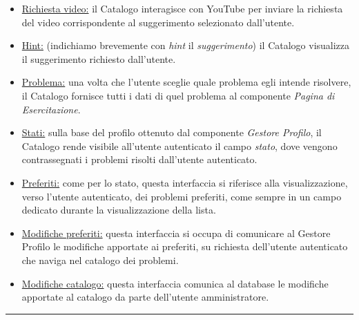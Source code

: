 \documentclass[11pt, a4paper]{article}
\theoremstyle{definition} %
\begin{document}
\begin{description}
\begin{itemize}
        \item \underline{Richiesta video:} il Catalogo interagisce con
        YouTube per inviare la richiesta del video corrispondente al
        suggerimento selezionato dall'utente.

        \item \underline{Hint:} (indichiamo brevemente con \textit{hint}
        il \textit{suggerimento}) il Catalogo visualizza il suggerimento
        richiesto dall'utente.

        \item \underline{Problema:} una volta che l'utente sceglie quale
        problema egli intende risolvere, il Catalogo fornisce tutti i
        dati di quel problema al componente \textit{Pagina di Esercitazione}.

        \item \underline{Stati:} sulla base del profilo ottenuto
        dal componente \textit{Gestore Profilo}, il Catalogo rende
        visibile all'utente autenticato il campo \textit{stato},
        dove vengono contrassegnati i problemi risolti dall'utente
        autenticato.

        \item \underline{Preferiti:} come per lo stato, questa
        interfaccia si riferisce alla visualizzazione, verso l'utente
        autenticato, dei problemi preferiti, come sempre in un
        campo dedicato durante la visualizzazione della lista.

        \item \underline{Modifiche preferiti:} questa interfaccia
        si occupa di comunicare al Gestore Profilo le modifiche
        apportate ai preferiti, su richiesta dell'utente autenticato
        che naviga nel catalogo dei problemi.

        \item \underline{Modifiche catalogo:} questa interfaccia
        comunica al database le modifiche apportate al catalogo
        da parte dell'utente amministratore.
    \end{itemize}
\end{description}

\begin{center}
    \rule{5cm}{1pt}
\end{center}
\end{document}
